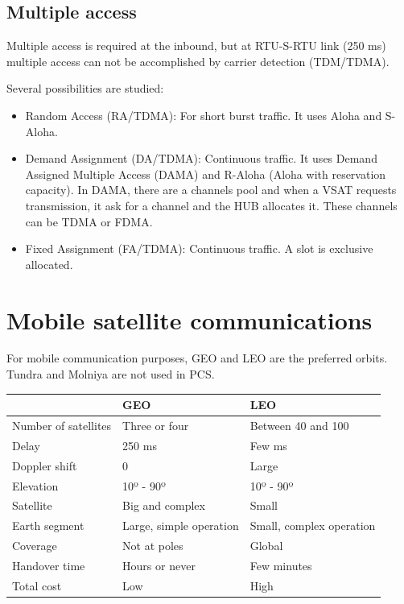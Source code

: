 \documentclass[../main.tex]{subfiles}
\begin{document}
\subsection{Multiple access}

Multiple access is required at the inbound, but at RTU-S-RTU link (250 ms) multiple access can not be accomplished by carrier detection (TDM/TDMA).

Several possibilities are studied:
\begin{itemize}
	\item Random Access (RA/TDMA): For short burst traffic. It uses Aloha and S-Aloha.
	\item Demand Assignment (DA/TDMA): Continuous traffic. It uses Demand Assigned Multiple Access (DAMA) and R-Aloha (Aloha with reservation capacity). In DAMA, there are a channels pool and when a VSAT requests transmission, it ask for a channel and the HUB allocates it. These channels can be TDMA or FDMA.
	\item Fixed Assignment (FA/TDMA): Continuous traffic. A slot is exclusive allocated.
\end{itemize}

\section{Mobile satellite communications}

For mobile communication purposes, GEO and LEO are the preferred orbits. Tundra and Molniya are not used in PCS.

\begin{tabular}{|l|l|l|}
	\hline
							& GEO						& LEO \\
	\hline
	Number of satellites	& Three or four				& Between 40 and 100 \\
	\hline
	Delay					& 250 ms					& Few ms \\
	\hline
	Doppler shift			& 0							& Large \\
	\hline
	Elevation				& 10º - 90º					& 10º - 90º \\
	\hline
	Satellite				& Big and complex			& Small \\
	\hline
	Earth segment			& Large, simple operation	& Small, complex operation \\
	\hline
	Coverage				& Not at poles				& Global \\
	\hline
	Handover time			& Hours or never			& Few minutes \\
	\hline
	Total cost				& Low						& High \\
	\hline
\end{tabular}
\end{document}
